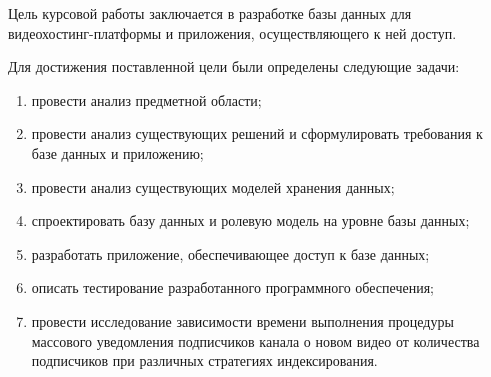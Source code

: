 
Цель курсовой работы заключается в разработке базы данных для \\ видеохостинг-платформы и приложения, осуществляющего к ней доступ.

Для достижения поставленной цели были определены следующие задачи:
\begin{enumerate}
    \item провести анализ предметной области;
    \item провести анализ существующих решений и сформулировать требования к базе данных и приложению;
    \item провести анализ существующих моделей хранения данных;
    \item спроектировать базу данных и ролевую модель на уровне базы данных;
    \item разработать приложение, обеспечивающее доступ к базе данных;
    \item описать тестирование разработанного программного обеспечения;
    \item провести исследование зависимости времени выполнения процедуры массового уведомления подписчиков канала о новом видео от количества подписчиков при различных стратегиях индексирования.
\end{enumerate}
\clearpage